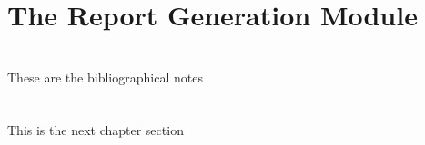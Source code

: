 \section{The Report Generation Module}
\label{cap1:sec:analysis}

\section*{\NotasBibliograficas}
\TocNotasBibliograficas

These are the bibliographical notes
\citep{ldesc2e}

\medskip



\section*{\ProximoCapitulo}
\TocProximoCapitulo

This is the next chapter section

